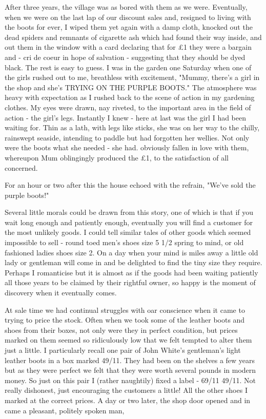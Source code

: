 After three years, the village was as bored with them as we were. Eventually, when we were on the last lap of our discount sales and, resigned to living with the boots for ever, I wiped them yet again with a damp cloth, knocked out the dead spiders and remnants of cigarette ash which had found their way inside, and out them in the window with a card declaring that for £1 they were a bargain and - cri de coeur in hope of salvation - suggesting that they should be dyed black. The rest is easy to guess. I was in the garden one Saturday when one of the girls rushed out to me, breathless with excitement, "Mummy, there's a girl in the shop and she's TRYING ON THE PURPLE BOOTS." The atmosphere was heavy with expectation as I rushed back to the scene of action in my gardening clothes. My eyes were drawn, nay riveted, to the important area in the field of action - the girl's legs. Instantly I knew - here at last was the girl I had been waiting for. Thin as a lath, with legs like sticks, she was on her way to the chilly, rainswept seaside, intending to paddle but had forgotten her wellies. Not only were the boots what she needed - she had. obviously fallen in love with them, whereupon Mum oblingingly produced the £1, to the satisfaction of all concerned.

For an hour or two after this the house echoed with the refrain, "We've sold the purple boots!"

Several little morals could be drawn from this story, one of which is that if you wait long enough and patiently enough, eventually you will find a customer for the most unlikely goods. I could tell similar tales of other goods which seemed impossible to sell - round toed men's shoes size 5 1/2 spring to mind, or old fashioned ladies shoes size 2. On a day when your mind is miles away a little old lady or gentleman will come in and be delighted to find the tiny size they require. Perhaps I romanticise but it is almost as if the goods had been waiting patiently all those years to be claimed by their rightful owner, so happy is the moment of discovery when it eventually comes.

At sale time we had continual struggles with oar conscience when it came to trying to price the stock. Often when we took some of the leather boots and shoes from their boxes, not only were they in perfect condition, but prices marked on them seemed so ridiculously low that we felt tempted to alter them just a little. I particularly recall one pair of John White’s gentleman’s light leather boots in a box marked 49/11. They had been on the shelves a few years but as they were perfect we felt that they were worth several pounds in modern money. So just on this pair I (rather naughtily) fixed a label - 69/11 49/11. Not really dishonest, just encouraging the customers a little! All the other shoes I marked at the correct prices. A day or two later, the shop door opened and in came a pleasant, politely spoken man,

